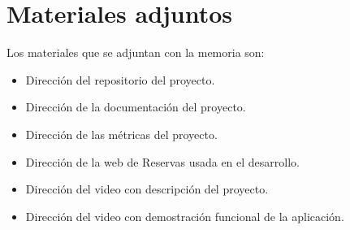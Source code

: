 \section{Materiales adjuntos}\label{materiales-adjuntos}

Los materiales que se adjuntan con la memoria son: 

\begin{itemize}
\tightlist
\item
	Dirección del repositorio del proyecto.
\item
	Dirección de la documentación del proyecto.
\item	
	Dirección de las métricas del proyecto.
\item	
    Dirección de la web de Reservas usada en el desarrollo.
\item
	Dirección del video con descripción del proyecto.
\item	
	Dirección del video con demostración funcional de la aplicación.
\end{itemize}
